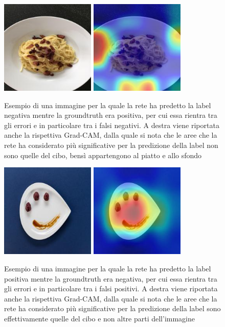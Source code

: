 \begin{figure}[H]
\centering
\includegraphics[height=45mm]{images/falseNegImg.jpg}
\quad
\includegraphics[height=45mm]{images/falseNegCAM.jpg}
\quad
\caption{Esempio di una immagine per la quale la rete ha predetto la label negativa mentre la groundtruth era positiva, per cui essa rientra tra gli errori e in particolare tra i falsi negativi. A destra viene riportata anche la rispettiva Grad-CAM, dalla quale si nota che le aree che la rete ha considerato più significative per la predizione della label non sono quelle del cibo, bensì appartengono al piatto e allo sfondo}
\label{FalseNeg}
\end{figure}

\begin{figure}[H]
\centering
\includegraphics[height=45mm]{images/falsePosImg.jpg}
\quad
\includegraphics[height=45mm]{images/falsePosCAM.jpg}
\quad
\caption{Esempio di una immagine per la quale la rete ha predetto la label positiva mentre la groundtruth era negativa, per cui essa rientra tra gli errori e in particolare tra i falsi positivi. A destra viene riportata anche la rispettiva Grad-CAM, dalla quale si nota che le aree che la rete ha considerato più significative per la predizione della label sono effettivamente quelle del cibo e non altre parti dell'immagine}
\label{FalsePos}
\end{figure}

